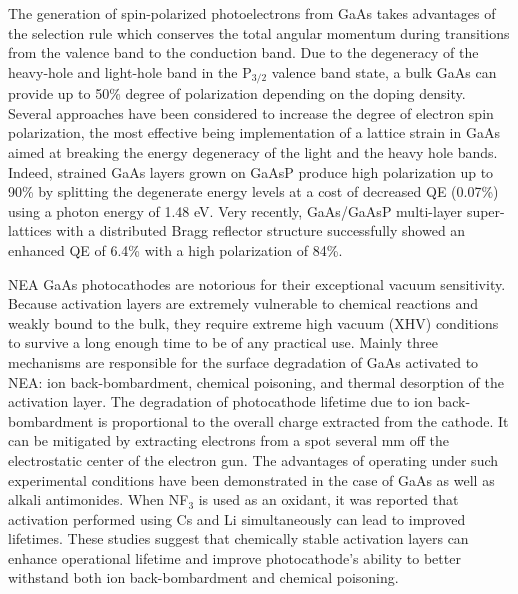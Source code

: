 The generation of spin-polarized photoelectrons from GaAs takes advantages of the selection rule which conserves the total angular momentum during transitions from the valence band to the conduction band. Due to the degeneracy of the heavy-hole and light-hole band in the P$_{3/2}$ valence band state, a bulk GaAs can provide up to 50\% degree of polarization depending on the doping density.\cite{liu2017_ComprehensiveEvaluationFactors}
Several approaches have been considered to increase the degree of electron spin polarization, the most effective being implementation of a lattice strain in GaAs aimed at breaking the energy degeneracy of the light and the heavy hole bands. Indeed, strained GaAs layers grown on GaAsP produce high polarization up to 90\% by splitting the degenerate energy levels at a cost of decreased QE (0.07\%) using a photon energy of 1.48 eV.\cite{maruyama1992_ElectronspinPolarizationPhotoemission} 
Very recently, GaAs/GaAsP multi-layer super-lattices with a distributed Bragg reflector structure successfully showed an enhanced QE of 6.4\% with a high polarization of 84\%.\cite{liu2016_RecordlevelQuantumEfficiency} 

NEA GaAs photocathodes are notorious for their exceptional vacuum sensitivity. Because activation layers are extremely vulnerable to chemical reactions and weakly bound to the bulk, they require extreme high vacuum (XHV) conditions to survive a long enough time to be of any practical use. Mainly three mechanisms are responsible for the surface degradation of GaAs activated to NEA: ion back-bombardment,\cite{grames2011_ChargeFluenceLifetime} chemical poisoning,\cite{chanlek2014_DegradationQuantumEfficiency} and thermal desorption of the activation layer.\cite{kuriki2011_DarklifetimeDegradationGaAs}
The degradation of photocathode lifetime due to ion back-bombardment is proportional to the overall charge extracted from the cathode. It can be mitigated by extracting electrons from a spot several mm off the electrostatic center of the electron gun.\cite{grames2011_ChargeFluenceLifetime} The advantages of operating under such experimental conditions have been demonstrated in the case of GaAs as well as alkali antimonides.\cite{cultrera2011_PhotocathodeBehaviorHigh,mammei2013_ChargeLifetimeMeasurements}
When NF$_3$ is used as an oxidant, it was reported that activation performed using Cs and Li simultaneously can lead to improved lifetimes.\cite{sun2009_SurfaceActivationLayer,mulhollan2008_EnhancedChemicalImmunity} These studies suggest that chemically stable activation layers can enhance operational lifetime and improve photocathode's ability to better withstand both ion back-bombardment and chemical poisoning.

